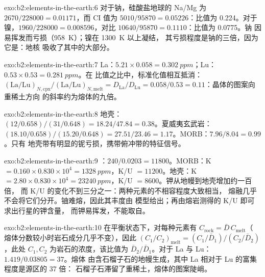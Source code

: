 \begin{solution}{exo:b2:elements-in-the-earth:6}
对于钠，硅酸盐地球的 Na/Mg 为 $2670/\num{228000} = 0.01171$，而 CI
值为 $5010/\num{95870} = 0.05226$：比值为 0.224。对于镍，$1960/\num{228000}
= 0.008596$，对比 $\num{10640}/\num{95870} = 0.1110$：比值为 0.0775。钠
因易挥发而亏损（\qty{958}{K}）；镍在 \qty{1300}{K} 以上凝结，
其亏损程度是钠的三倍，因为它是：地核
吸收了其中的大部分。
\end{solution}

\begin{solution}{exo:b2:elements-in-the-earth:7}
La：$5.21\times0.058 = \qty{0.302}{ppm}$；Lu：$0.53\times0.53 = \qty{0.281}{ppm}$。在
比值之比中，标准化值相互抵消：
$(\mathrm{La}/\mathrm{Lu})_{N,\mathrm{cpx}}/(\mathrm{La}/\mathrm{Lu})_{N,\mathrm{melt}} =
D_{\mathrm{La}}/D_{\mathrm{Lu}} = 0.058/0.53 = 0.11$：晶体的图案向重稀土方向
的斜率约为熔体的九倍。
\end{solution}

\begin{solution}{exo:b2:elements-in-the-earth:8}
地壳：$(12/0.658)/(31/0.648) = 18.24/47.84 = 0.38$。夏威夷玄武岩：
$(18.10/0.658)/(15.20/0.648) = 27.51/23.46 = 1.17$。MORB：$7.96/8.04 = 0.99$。只有
地壳带有明显的铌亏损，携带俯冲带的特征信号。
\end{solution}

\begin{solution}{exo:b2:elements-in-the-earth:9}
：$240/0.0203 = \num{11800}$。MORB：K $= 0.160\times0.830\times10^4 =
\qty{1328}{ppm}$，K/U $= \num{11200}$。地壳：K $= 2.80\times0.830\times10^4 =
\qty{23240}{ppm}$，K/U $= \num{8600}$。钾从地幔到地壳增加约一百倍，
而 K/U 的变化不到三分之一：两种元素的不相容程度大致相当，
熔融几乎不会将它们分开。铀难熔，因此其丰度由
模型给出；再由熔岩测得的 K/U 即可求出行星的钾含量，
而钾易挥发，不能取自。
\end{solution}

\begin{solution}{exo:b2:elements-in-the-earth:10}
在平衡状态下，对每种元素有 $C_{\mathrm{rock}} = \bar D\,C_{\mathrm{melt}}$（
熔体分数较小时岩石成分几乎不变），因此
$(C_1/C_2)_{\mathrm{melt}} = (C_{1}/\bar D_1)/(C_{2}/\bar D_2)$，此处 $C_1,
C_2$ 为岩石的浓度，该比值为 $\bar D_2/\bar D_1$。对于 La 与 Lu：$1.419/0.03805 = 37$。熔体
由含石榴子石的地幔生成，其中 La 相对于 Lu 的富集程度是源区的 37 倍：
石榴子石滞留了重稀土，熔体的图案陡峭。
\end{solution}

